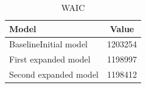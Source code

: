 \begin{table}[ht]
\centering
\caption{WAIC} 
\label{tab:waic}
\begin{tabular}{lc}
  \hline
Model & Value \\ 
  \hline
{\color{yellow}Baseline}{\color{magenta}Initial} model & 1203254 \\ 
  First expanded model & 1198997 \\ 
  Second expanded model  & 1198412 \\ 
   \hline
\end{tabular}
\end{table}
